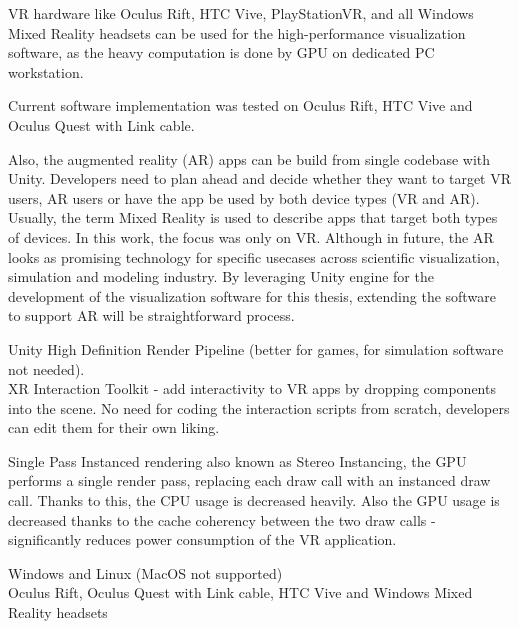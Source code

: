 VR hardware like Oculus Rift, HTC Vive, PlayStationVR, and all Windows Mixed Reality headsets can be used for the high-performance visualization software, as the heavy computation is done by GPU on dedicated PC workstation.

Current software implementation was tested on Oculus Rift, HTC Vive and Oculus Quest with Link cable.

Also, the augmented reality (AR) apps can be build from single codebase with Unity. Developers need to plan ahead and decide whether they want to target VR users, AR users or have the app be used by both device types (VR and AR). Usually, the term Mixed Reality is used to describe apps that target both types of devices. In this work, the focus was only on VR. Although in future, the AR looks as promising technology for specific usecases across scientific visualization, simulation and modeling industry. By leveraging Unity engine for the development of the visualization software for  this thesis, extending the software to support AR will be straightforward process.

Unity High Definition Render Pipeline (better for games, for simulation software not needed). \\

XR Interaction Toolkit - add interactivity to VR apps by dropping components into the scene. No need for coding the interaction scripts from scratch, developers can edit them for their own liking.

Single Pass Instanced rendering also known as Stereo Instancing, the GPU performs a single render pass, replacing each draw call with an instanced draw call. Thanks to this, the CPU usage is decreased heavily. Also the GPU usage is decreased thanks to the cache coherency between the two draw calls - significantly reduces power consumption of the VR application.

Windows and Linux (MacOS not supported) \\

Oculus Rift, Oculus Quest with Link cable, HTC Vive and Windows Mixed Reality headsets \\

